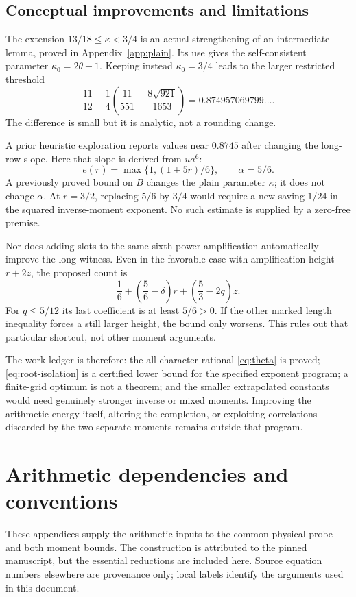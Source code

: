 \documentclass[12pt]{article}
\begin{document}
\subsection{Conceptual improvements and limitations}
The extension \(13/18\le\kappa<3/4\) is an actual strengthening
of an intermediate lemma, proved in Appendix~\ref{app:plain}.
Its use gives the self-consistent parameter \(\kappa_0=2\theta-1\).
Keeping instead \(\kappa_0=3/4\) leads to the larger restricted
threshold
\[
 \frac{11}{12}
  -\frac14\left(\frac{11}{551}+\frac{8\sqrt{921}}{1653}\right)
  =0.874957069799\ldots .
\]
The difference is small but it is analytic, not a rounding change.

A prior heuristic exploration \cite{Exploration} reports values
near \(0.8745\) after changing the long-row slope.
Here that slope is derived from \(ua^6\):
\[
 e(r)=\max\{1,(1+5r)/6\},\qquad \alpha=5/6.
\]
A previously proved bound on \(B\) changes the plain parameter
\(\kappa\); it does not change \(\alpha\).
At \(r=3/2\), replacing \(5/6\) by \(3/4\) would require
a new saving \(1/24\) in the squared inverse-moment exponent.
No such estimate is supplied by a zero-free premise.

Nor does adding slots to the same sixth-power amplification
automatically improve the long witness.  Even in the favorable
case with amplification height \(r+2z\), the proposed count is
\[
 \frac16+\left(\frac56-\delta\right)r
                     +\left(\frac53-2q\right)z .
\]
For \(q\le5/12\) its last coefficient is at least \(5/6>0\).
If the other marked length inequality forces a still larger
height, the bound only worsens.
This rules out that particular shortcut, not other moment arguments.

The work ledger is therefore: the all-character rational
\eqref{eq:theta} is proved; \eqref{eq:root-isolation} is a certified
lower bound for the specified exponent program; a finite-grid
optimum is not a theorem; and the smaller extrapolated constants
would need genuinely stronger inverse or mixed moments.
Improving the arithmetic energy itself, altering the completion,
or exploiting correlations discarded by the two separate moments
remains outside that program.
\appendix
\section{Arithmetic dependencies and conventions}\label{app:conventions}

These appendices supply the arithmetic inputs to the common physical
probe and both moment bounds.  The construction is attributed to the
pinned manuscript, but the essential reductions are included here.
Source equation numbers elsewhere are provenance only; local labels
identify the arguments used in this document.
\end{document}
